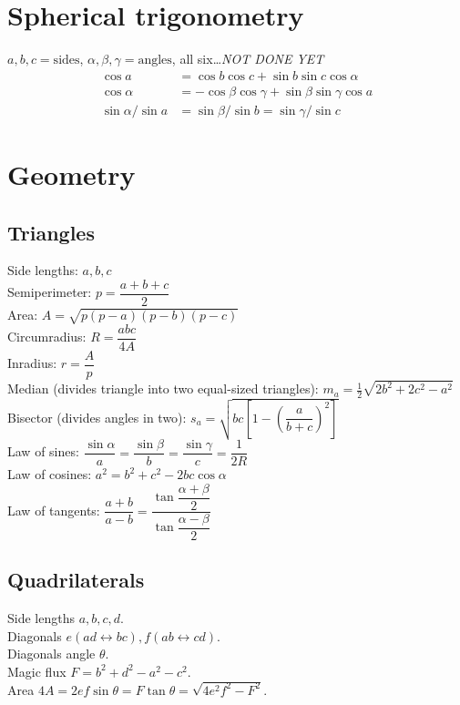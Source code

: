 \section{Spherical trigonometry}
$a,b,c=\text{sides}$, $\alpha,\beta,\gamma=\text{angles}$, all
six\ldots \emph{NOT DONE YET}
\begin{align*}
\cos a&{}=\cos b \cos c + \sin b \sin c \cos \alpha\\
\cos \alpha&{}=-\cos\beta \cos\gamma + \sin\beta\sin\gamma\cos a\\
\sin \alpha/\sin a&{}=\sin\beta/\sin b=\sin\gamma/\sin c
\end{align*}

\section{Geometry}

\subsection{Triangles}
Side lengths: $a,b,c$\\
Semiperimeter: $p=\dfrac{a+b+c}{2}$\\
Area: $A=\sqrt{p(p-a)(p-b)(p-c)}$\\
Circumradius: $R=\dfrac{abc}{4A}$\\
Inradius: $r=\dfrac{A}{p}$\\
Median (divides triangle into two equal-sized triangles): $m_a=\tfrac{1}{2}\sqrt{2b^2+2c^2-a^2}$\\
Bisector (divides angles in two): $s_a=\sqrt{bc\left[1-\left(\dfrac{a}{b+c}\right)^2\right]}$\\
Law of sines: $\dfrac{\sin\alpha}{a}=\dfrac{\sin\beta}{b}=\dfrac{\sin\gamma}{c}=\dfrac{1}{2R}$\\
Law of cosines: $a^2=b^2+c^2-2bc\cos\alpha$\\
Law of tangents: $\dfrac{a+b}{a-b}=\dfrac{\tan\dfrac{\alpha+\beta}{2}}{\tan\dfrac{\alpha-\beta}{2}}$\\

\vspace{2mm} %
\subsection{Quadrilaterals}
Side lengths $a,b,c,d$.\\
Diagonals $e(ad\leftrightarrow bc), f(ab\leftrightarrow cd)$.\\
Diagonals angle $\theta$.\\
Magic flux $F=b^2+d^2-a^2-c^2$.\\
Area $4A=2ef\sin\theta=F\tan\theta=\sqrt{4e^2f^2-F^2}$.\\

